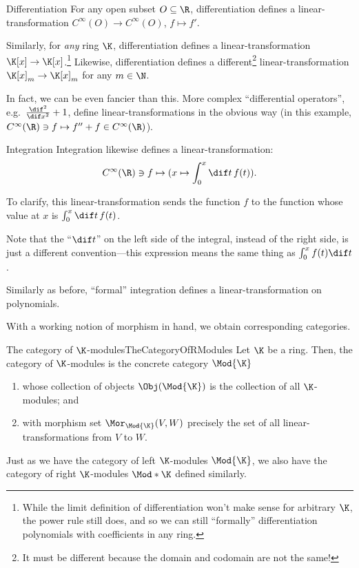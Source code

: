 \begin{exm}{Differentiation}{}
	For any open subset $O\subseteq \R$, differentiation defines a linear-transformation $C^{\infty}(O)\rightarrow C^{\infty}(O)$, $f\mapsto f'$.
	
	Similarly, for \emph{any} ring $\K$, differentiation defines a linear-transformation $\K [x]\rightarrow \K [x]$.\footnote{While the limit definition of differentiation won't make sense for arbitrary $\K$, the power rule still does, and so we can still ``formally'' differentiation polynomials with coefficients in any ring.}  Likewise, differentiation defines a different\footnote{It must be different because the domain and codomain are not the same!} linear-transformation $\K [x]_m\rightarrow \K [x]_m$ for any $m\in \N$.
	
	In fact, we can be even fancier than this.  More complex ``differential operators'', e.g.~$\frac{\dif ^2}{\dif x^2}+1$, define linear-transformations in the obvious way (in this example, $C^{\infty}(\R )\ni f\mapsto f''+f\in C^{\infty}(\R )$).
\end{exm}
\begin{exm}{Integration}{}
	Integration likewise defines a linear-transformation:
	\begin{equation}
		C^{\infty}(\R )\ni f\mapsto (x\mapsto \int _0^x\dif t\, f(t)).
	\end{equation}
	\begin{rmk}
		To clarify, this linear-transformation sends the function $f$ to the function whose value at $x$ is $\int _0^x\dif t\, f(t)$.
	\end{rmk}
	\begin{rmk}
		Note that the ``$\dif t$'' on the left side of the integral, instead of the right side, is just a different convention---this expression means the same thing as $\int _0^xf(t)\dif t$.
	\end{rmk}

	Similarly as before, ``formal'' integration defines a linear-transformation on polynomials.
\end{exm}
With a working notion of morphism in hand, we obtain corresponding categories.
\begin{exm}{The category of $\K$-modules}{TheCategoryOfRModules}
	Let $\K$ be a ring.  Then, the category of $\K$-modules is the concrete category $\Mod{\K}$\index[notation]{$\Mod{\K}$}
	\begin{enumerate}
		\item whose collection of objects $\Obj (\Mod{\K})$ is the collection of all $\K$-modules; and
		\item with morphism set $\Mor _{\Mod{\K}}(V,W)$ precisely the set of all linear-transformations from $V$ to $W$.
	\end{enumerate}
	\begin{rmk}
		Just as we have the category of left $\K$-modules $\Mod{\K}$, we also have the category of right $\K$-modules $\Mod*{\K}$\index[notation]{$\Mod*{\K}$} defined similarly.
	\end{rmk}
\end{exm}
